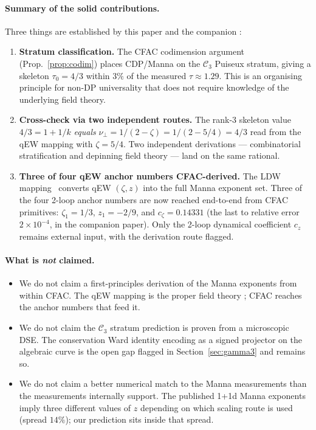 \documentclass[10pt,a4paper,twocolumn]{article}
\theoremstyle{plain}
\theoremstyle{definition}
\newcommand{\Cstr}[1]{\mathcal{C}_{#1}}
\begin{document}
\paragraph{Summary of the solid contributions.}
Three things are established by this paper and the companion
\citep{Amarteifio2026LDWC}:
\begin{enumerate}[leftmargin=1.4em,itemsep=2pt]
  \item \textbf{Stratum classification.} The CFAC codimension
    argument (Prop.~\ref{prop:codim}) places CDP/Manna on the
    $\Cstr{3}$ Puiseux stratum, giving a skeleton
    $\tau_0 = 4/3$ within $3\%$ of the measured $\tau \approx
    1.29$.  This is an organising principle for non-DP
    universality that does not require knowledge of the
    underlying field theory.
  \item \textbf{Cross-check via two independent routes.}  The
    rank-3 skeleton value $4/3 = 1 + 1/k$ \emph{equals}
    $\nu_\perp = 1/(2 - \zeta) = 1/(2 - 5/4) = 4/3$ read from
    the qEW mapping with $\zeta = 5/4$.  Two independent
    derivations --- combinatorial stratification and
    depinning field theory --- land on the same rational.
  \item \textbf{Three of four qEW anchor numbers CFAC-derived.}
    The LDW mapping~\citep{LeDoussalWiese2015} converts
    qEW $(\zeta, z)$ into the full Manna exponent set.  Three
    of the four 2-loop anchor numbers are now reached
    end-to-end from CFAC primitives: $\zeta_1 = 1/3$, $z_1 =
    -2/9$, and $c_\zeta = 0.14331$ (the last to relative error
    $2\times 10^{-4}$, in the companion paper).  Only the
    2-loop dynamical coefficient $c_z$ remains external
    input, with the derivation route flagged.
\end{enumerate}

\paragraph{What is \emph{not} claimed.}
\begin{itemize}[leftmargin=1.2em,itemsep=1pt]
  \item We do not claim a first-principles derivation of the
    Manna exponents from within CFAC.  The qEW mapping is the
    proper field theory \citep{LeDoussalWiese2015}; CFAC
    reaches the anchor numbers that feed it.
  \item We do not claim the $\Cstr{3}$ stratum prediction is
    proven from a microscopic DSE.  The conservation Ward
    identity encoding as a signed projector on the algebraic
    curve is the open gap flagged in
    Section~\ref{sec:gamma3} and remains so.
  \item We do not claim a better numerical match to the Manna
    measurements than the measurements internally support.
    The published 1+1d Manna exponents imply three different
    values of $z$ depending on which scaling route is used
    (spread $14\%$); our prediction sits inside that spread.
\end{itemize}
\end{document}
